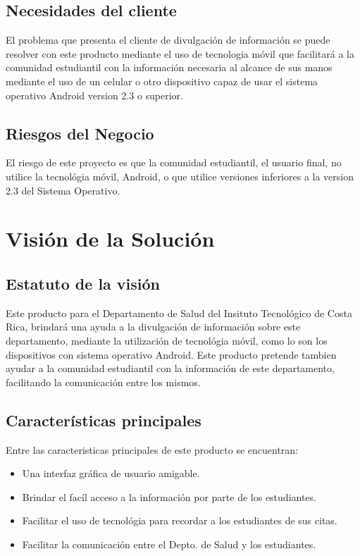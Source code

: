 \documentclass[12pt]{article}
\begin{document}
\subsection{Necesidades del cliente}

El problema que presenta el cliente de divulgaci\'on de informaci\'on se puede resolver con este producto mediante el uso de tecnologia m\'ovil que facilitar\'a a la comunidad estudiantil con la informaci\'on necesaria al alcance de sus manos mediante el uso de un celular o otro dispositivo capaz de usar el sistema operativo Android version 2.3 o superior.

\subsection{Riesgos del Negocio}

El riesgo de este proyecto es que la comunidad estudiantil, el usuario final, no utilice la tecnol\'ogia m\'ovil, Android, o que utilice versiones inferiores a la version 2.3 del Sistema Operativo.

\newpage
\section{Visi\'on de la Soluci\'on}

\subsection{Estatuto de la visi\'on}

Este producto para el Departamento de Salud del Insituto Tecnol\'ogico de Costa Rica, brindar\'a una ayuda a la divulgaci\'on de informaci\'on sobre este departamento, mediante la utilizaci\'on de tecnol\'ogia m\'ovil, como lo son los dispositivos con sistema operativo Android. Este producto pretende tambien ayudar a la comunidad estudiantil con la informaci\'on de este departamento, facilitando la comunicaci\'on entre los mismos.

\subsection{Características principales}

Entre las caracteristicas principales de este producto se encuentran:
\begin{itemize}
	\item{Una interfaz gr\'afica de usuario amigable.}
	\item{Brindar el fac\'il acceso a la informaci\'on por parte de los estudiantes.}
	\item{Facilitar el uso de tecnol\'ogia para recordar a los estudiantes de sus citas.}
	\item{Facilitar la comunicaci\'on entre el Depto. de Salud y los estudiantes.}
\end{itemize}
\end{document}
